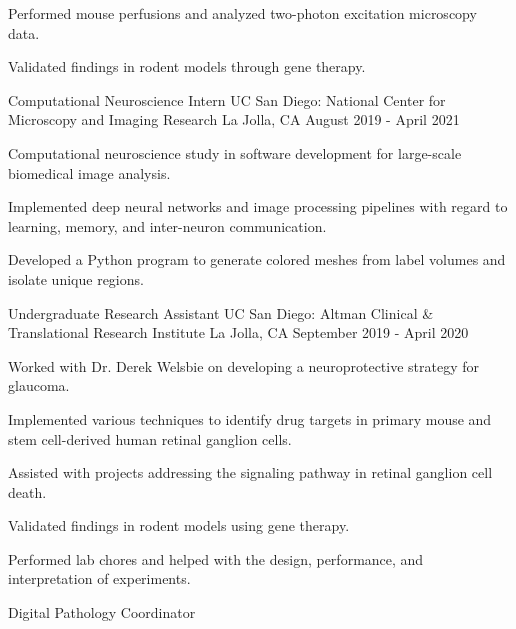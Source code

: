 \begin{cventries}
{\begin{cvitems}
    \item {Performed mouse perfusions and analyzed two-photon excitation microscopy data.}
    \item {Validated findings in rodent models through gene therapy.}
  \end{cvitems}
}
\cventry
{Computational Neuroscience Intern} %
{UC San Diego: National Center for Microscopy and Imaging Research} %
{La Jolla, CA} %
{August 2019 - April 2021} %
{
  \begin{cvitems} %
    \item {Computational neuroscience study in software development for large-scale biomedical image analysis.}
    \item {Implemented deep neural networks and image processing pipelines with regard to learning, memory, and inter-neuron communication.}
    \item {Developed a Python program to generate colored meshes from label volumes and isolate unique regions.}
  \end{cvitems}
}
  \cventry
    {Undergraduate Research Assistant} %
    {UC San Diego: Altman Clinical \& Translational Research Institute} %
    {La Jolla, CA} %
    {September 2019 - April 2020} %
    {
      \begin{cvitems} %
        \item {Worked with Dr. Derek Welsbie on developing a neuroprotective strategy for glaucoma.}
        \item {Implemented various techniques to identify drug targets in primary mouse and stem cell-derived human retinal ganglion cells.}
        \item {Assisted with projects addressing the signaling pathway in retinal ganglion cell death.}
        \item {Validated findings in rodent models using gene therapy.}
        \item {Performed lab chores and helped with the design, performance, and interpretation of experiments.}
      \end{cvitems}
    }
  \cventry
    {Digital Pathology Coordinator} %

\end{cventries}
